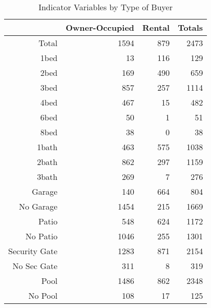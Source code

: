 \begin{table}[ht]
\centering
\begin{tabular}{rrrr}
  \hline
 & Owner-Occupied & Rental & Totals \\ 
  \hline
Total & 1594 & 879 & 2473 \\ 
  1bed & 13 & 116 & 129 \\ 
  2bed & 169 & 490 & 659 \\ 
  3bed & 857 & 257 & 1114 \\ 
  4bed & 467 & 15 & 482 \\ 
  6bed & 50 & 1 & 51 \\ 
  8bed & 38 & 0 & 38 \\ 
  1bath & 463 & 575 & 1038 \\ 
  2bath & 862 & 297 & 1159 \\ 
  3bath & 269 & 7 & 276 \\ 
  Garage & 140 & 664 & 804 \\ 
  No Garage & 1454 & 215 & 1669 \\ 
  Patio & 548 & 624 & 1172 \\ 
  No Patio & 1046 & 255 & 1301 \\ 
  Security Gate & 1283 & 871 & 2154 \\ 
  No Sec Gate & 311 & 8 & 319 \\ 
  Pool & 1486 & 862 & 2348 \\ 
  No Pool & 108 & 17 & 125 \\ 
   \hline
\end{tabular}
\caption{Indicator Variables by Type of Buyer} 
\label{tab:ind_by_buyer}
\end{table}

